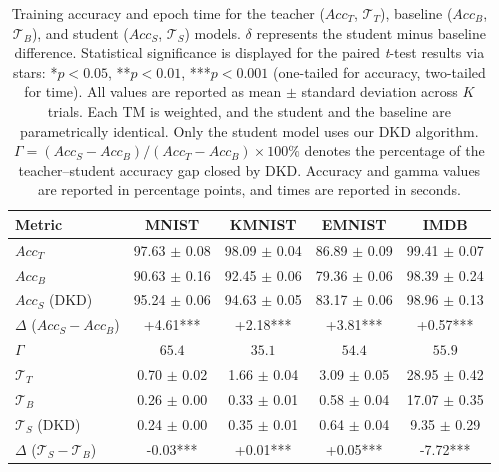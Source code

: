 \documentclass[sn-mathphys-num]{sn-jnl}%
\theoremstyle{thmstyleone}%
\theoremstyle{thmstyletwo}%
\theoremstyle{thmstylethree}%
\begin{document}
\begin{table}
	\centering
	\caption{Training accuracy and epoch time for the teacher ($Acc_T$, $\mathcal{T}_T$), baseline ($Acc_B$, $\mathcal{T}_B$), and student ($Acc_S$, $\mathcal{T}_S$) models. $\delta$ represents the student minus baseline difference. Statistical significance is displayed for the paired \textit{t}-test results via stars: {*}$p < 0.05$, {**}$p < 0.01$, {***}$p < 0.001$ (one-tailed for accuracy, two-tailed for time). All values are reported as mean $\pm$ standard deviation across $K$ trials. Each TM is weighted, and the student and the baseline are parametrically identical. Only the student model uses our DKD algorithm. $\Gamma = (Acc_S - Acc_B)/(Acc_T - Acc_B) \times 100\%$ denotes the percentage of the teacher--student accuracy gap closed by DKD. Accuracy and gamma values are reported in percentage points, and times are reported in seconds.}
	\begin{tabular}{l|cccc}
		\hline
		Metric & MNIST & KMNIST & EMNIST & IMDB \\
		\hline
		$Acc_T$ & 97.63 $\pm$ 0.08 & 98.09 $\pm$ 0.04 & 86.89 $\pm$ 0.09 & 99.41 $\pm$ 0.07 \\
		$Acc_B$ & 90.63 $\pm$ 0.16 & 92.45 $\pm$ 0.06 & 79.36 $\pm$ 0.06 & 98.39 $\pm$ 0.24 \\
		$Acc_S$ (DKD) & 95.24 $\pm$ 0.06 & 94.63 $\pm$ 0.05 & 83.17 $\pm$ 0.06 & 98.96 $\pm$ 0.13 \\
		$\Delta$ ($Acc_S-Acc_B$) & +4.61*** & +2.18*** & +3.81*** & +0.57*** \\
		$\Gamma$             & $65.4$        & $35.1$        & $54.4$        & $55.9$        \\
		\hline
		$\mathcal{T}_T$ & 0.70 $\pm$ 0.02 & 1.66 $\pm$ 0.04 & 3.09 $\pm$ 0.05 & 28.95 $\pm$ 0.42 \\
		$\mathcal{T}_B$ & 0.26 $\pm$ 0.00 & 0.33 $\pm$ 0.01 & 0.58 $\pm$ 0.04 & 17.07 $\pm$ 0.35 \\
		$\mathcal{T}_S$ (DKD)& 0.24 $\pm$ 0.00 & 0.35 $\pm$ 0.01 & 0.64 $\pm$ 0.04 & 9.35 $\pm$ 0.29 \\
		$\Delta$ ($\mathcal{T}_S-\mathcal{T}_B$) & -0.03*** & +0.01*** & +0.05*** & -7.72*** \\
		\hline
	\end{tabular}
	\label{tab:train-table-dkd}
\end{table}
\end{document}
